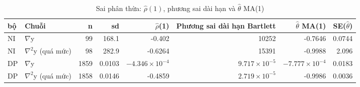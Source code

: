 \begin{table}[H]
\centering\small
\caption{Sai phân thừa: $\hat\rho(1)$, phương sai dài hạn và $\hat\theta$ MA(1)}\label{tab:tab_b12_03_overdifferencing}
\begin{adjustbox}{max width=\linewidth}
\begin{tabular}{llrrrrrr}
\toprule
bộ & Chuỗi & n & sd & $\hat{\rho}$(1) & Phương sai dài hạn Bartlett & $\hat{\theta}$ MA(1) & SE($\hat{\theta}$) \\
\midrule
NI & $\nabla$y & 99 & 168.1 & -0.402 & 10252 & -0.7646 & 0.0744 \\
NI & $\nabla^{2}$y (quá mức) & 98 & 282.9 & -0.6264 & 15391 & -0.9988 & 2.096 \\
DP & $\nabla$y & 1859 & 0.0103 & $-4.346\times10^{-4}$ & $9.717\times10^{-5}$ & $-7.777\times10^{-4}$ & 0.0183 \\
DP & $\nabla^{2}$y (quá mức) & 1858 & 0.0146 & -0.4859 & $2.719\times10^{-5}$ & -0.9986 & 0.0036 \\
\bottomrule
\end{tabular}
\end{adjustbox}\par{}
\end{table}
